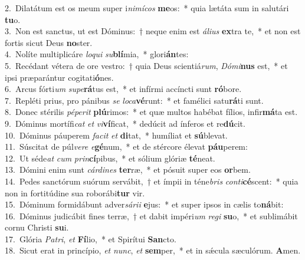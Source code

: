 {2.~}Dilatátum est os meum super i\textit{ni}\textit{mí}\textit{cos} \textbf{me}os:~* quia lætáta sum in salutári \textbf{tu}o.\\
{3.~}Non est sanctus, ut est Dóminus:~† neque enim est \textit{á}\textit{li}\textit{us} \textbf{ex}tra te,~* et non est fortis sicut Deus \textbf{no}ster.\\
{4.~}Nolíte multiplicáre \textit{lo}\textit{qui} \textit{su}\textbf{blí}mia,~* glori\textbf{án}tes:\\
{5.~}Recédant vétera de ore vestro:~† quia Deus scientiá\textit{rum}, \textit{Dó}\textit{mi}\textbf{nus} est,~* et ipsi præparántur cogitati\textbf{ó}nes.\\
{6.~}Arcus fórti\textit{um} \textit{su}\textit{pe}\textbf{rá}tus est,~* et infírmi accíncti sunt \textbf{ró}bore.\\
{7.~}Repléti prius, pro pánibus \textit{se} \textit{lo}\textit{ca}\textbf{vé}runt:~* et famélici satu\textbf{rá}ti sunt.\\
{8.~}Donec stérilis \textit{pé}\textit{pe}\textit{rit} \textbf{plú}rimos:~* et quæ multos habébat fílios, infir\textbf{má}ta est.\\
{9.~}Dóminus mortífi\textit{cat} \textit{et} \textit{vi}\textbf{ví}ficat,~* dedúcit ad ínferos et re\textbf{dú}cit.\\
{10.~}Dóminus páuperem \textit{fa}\textit{cit} \textit{et} \textbf{di}tat,~* humíliat et \textbf{sú}blevat.\\
{11.~}Súscitat de púl\textit{ve}\textit{re} \textit{e}\textbf{gé}num,~* et de stércore élevat \textbf{páu}perem:\\
{12.~}Ut séde\textit{at} \textit{cum} \textit{prin}\textbf{cí}pibus,~* et sólium glóriæ \textbf{té}neat.\\
{13.~}Dómini enim sunt \textit{cár}\textit{di}\textit{nes} \textbf{ter}ræ,~* et pósuit super eos \textbf{or}bem.\\
{14.~}Pedes sanctórum suórum servábit,~† et ímpii in téne\textit{bris} \textit{con}\textit{ti}\textbf{cé}scent:~* quia non in fortitúdine sua roborábi\textbf{tur} vir.\\
{15.~}Dóminum formidábunt adver\textit{sá}\textit{ri}\textit{i} \textbf{e}jus:~* et super ipsos in cælis to\textbf{ná}bit:\\
{16.~}Dóminus judicábit fines terræ,~† et dabit impéri\textit{um} \textit{re}\textit{gi} \textbf{su}o,~* et sublimábit cornu Christi \textbf{su}i.\\
{17.~}Glória \textit{Pa}\textit{tri}, \textit{et} \textbf{Fí}lio,~* et Spirítui \textbf{San}cto.\\
{18.~}Sicut erat in princípio, \textit{et} \textit{nunc}, \textit{et} \textbf{sem}per,~* et in sǽcula sæculórum. \textbf{A}men.\\
